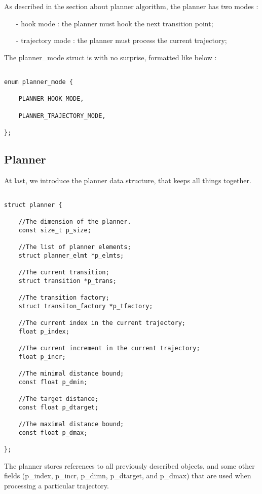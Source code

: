As described in the section about planner algorithm, the planner has two modes : 
\begin{itemize}
\item[-] hook mode : the planner must hook the next transition point;
\item[-] trajectory mode : the planner must process the current trajectory;
\end{itemize}

The planner\_mode struct is with no surprise, formatted like below : 


\begin{lstlisting}[style=Cstyle]

enum planner_mode {
	
	PLANNER_HOOK_MODE, 
	
	PLANNER_TRAJECTORY_MODE,
	
};

\end{lstlisting}


\subsection{Planner}

At last, we introduce the planner data structure, that keeps all things together. 


\begin{lstlisting}[style=Cstyle]

struct planner {
	
	//The dimension of the planner.
	const size_t p_size;

	//The list of planner elements;
	struct planner_elmt *p_elmts;
	
	//The current transition;
	struct transition *p_trans;
	
	//The transition factory;
	struct transiton_factory *p_tfactory;
	
	//The current index in the current trajectory;
	float p_index;

	//The current increment in the current trajectory;
	float p_incr;
	
	//The minimal distance bound;
	const float p_dmin;
	
	//The target distance;
	const float p_dtarget;
	
	//The maximal distance bound;
	const float p_dmax;
	
};

\end{lstlisting}

The planner stores references to all previously described objects, and some other fields (p\_index, p\_incr, 
p\_dimn, p\_dtarget, and p\_dmax) that are used when processing a particular trajectory. 

